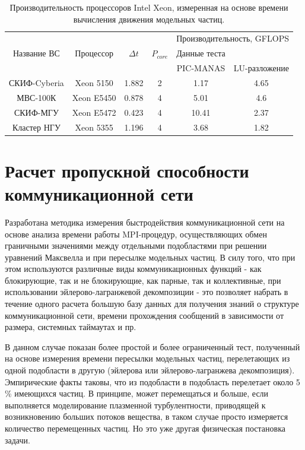 \begin{table}[ht]
	\caption{Производительность процессоров Intel Xeon, измеренная на основе времени вычисления движения модельных частиц.}
	\label{PIC_vs_LU}
	\begin{tabular}{|c|c|c|c|c|c|}
		\hline
		&            &            &             &       \multicolumn{2}{|c|}{Производительность, GFLOPS} \\ \cline{5-6}  	
		Название ВС  & Процессор  &  $\Delta t$ &$P_{core}$ & Данные теста  &  \\
		             &            &             &           & PIC-MANAS     & LU-разложение \\ \hline
		СКИФ-Cyberia & Xeon 5150  &  1.882      & 2     &  1.17          & 4.65    \\ \hline
		МВС-100К     & Xeon E5450 &  0.878      & 4     & 5.01           & 4.6     \\ \hline 
		СКИФ-МГУ     & Xeon E5472 &  0.423      & 4     & 10.41          & 2.37       \\ \hline     
		Кластер НГУ  & Xeon 5355  &  1.196      & 4     & 3.68           & 1.82       \\ \hline
	\end{tabular}	
\end{table}






\section{Расчет пропускной способности коммуникационной сети}
\label{perfCommNet}
Разработана методика измерения быстродействия коммуникационной сети на основе анализа времени работы MPI-процедур, осуществляющих обмен граничными значениями между отдельными подобластями при решении уравнений Максвелла и при пересылке модельных частиц. В силу того, что при этом используются различные виды коммуникационных функций  - как блокирующие, так и не блокирующие, как парные, так и коллективные, при использовании эйлерово-лагранжевой декомпозиции - это позволяет набрать в течение одного расчета большую базу данных для получения знаний о структуре коммуникационной сети, времени прохождения сообщений в зависимости от размера, системных таймаутах и пр. 

В данном случае показан более простой и более ограниченный тест, полученный на основе измерения времени пересылки модельных частиц, перелетающих из одной подобласти в другую (эйлерова или эйлерово-лагранжева декомпозиция). Эмпирические факты таковы, что из подобласти в подобласть перелетает около 5 \% имеющихся частиц. В принципе, может перемещаться и больше, если выполняется моделирование плазменной турбулентности, приводящей к возникновению больших потоков вещества, в таком случае просто измеряется количество перемещенных частиц. Но это уже другая физическая постановка задачи.

